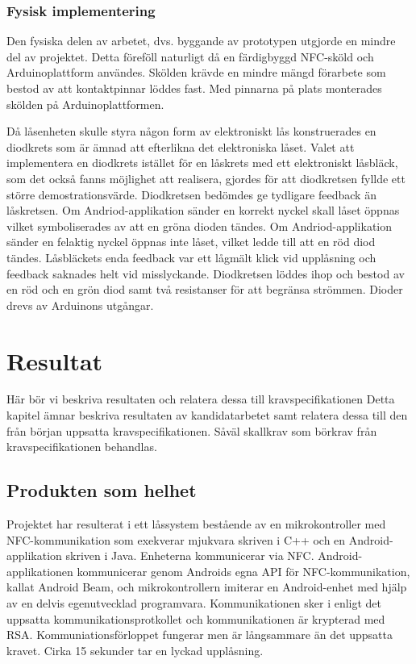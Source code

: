\documentclass[11pt]{article}
\begin{document}
\subsubsection{Fysisk implementering}
Den fysiska delen av arbetet, dvs. byggande av prototypen utgjorde en mindre del av projektet. Detta föreföll naturligt då en färdigbyggd NFC-sköld och Arduinoplattform användes. Skölden krävde en mindre mängd förarbete som bestod av att kontaktpinnar löddes fast. Med pinnarna på plats monterades skölden på Arduinoplattformen.

Då låsenheten skulle styra någon form av elektroniskt lås konstruerades en diodkrets som är ämnad att efterlikna det elektroniska låset. Valet att implementera en diodkrets istället för en låskrets med ett elektroniskt låsbläck, som det också fanns möjlighet att realisera, gjordes för att diodkretsen fyllde ett större demostrationsvärde. Diodkretsen bedömdes ge tydligare feedback än låskretsen. Om Andriod-applikation sänder en korrekt nyckel skall låset öppnas vilket symboliserades av att en gröna dioden tändes. Om Andriod-applikation sänder en felaktig nyckel öppnas inte låset, vilket ledde till att en röd diod tändes. Låsbläckets enda feedback var ett lågmält klick vid upplåsning och feedback saknades helt vid misslyckande. Diodkretsen löddes ihop och bestod av en röd och en grön diod samt två resistanser för att begränsa strömmen. Dioder drevs av Arduinons utgångar.


\section{Resultat}
Här bör vi beskriva resultaten och relatera dessa till kravspecifikationen
Detta kapitel ämnar beskriva resultaten av kandidatarbetet samt relatera dessa till den från början uppsatta kravspecifikationen. Såväl skallkrav som börkrav från kravspecifikationen behandlas.

\subsection{Produkten som helhet}
Projektet har resulterat i ett låssystem bestående av en mikrokontroller med NFC-kommunikation som exekverar mjukvara skriven i C++ och en Android-applikation skriven i Java. Enheterna kommunicerar via NFC. Android-applikationen kommunicerar genom Androids egna API för NFC-kommunikation, kallat Android Beam, och mikrokontrollern imiterar en Android-enhet med hjälp av en delvis egenutvecklad programvara. Kommunikationen sker i enligt det uppsatta kommunikationsprotkollet och kommunikationen är krypterad med RSA. Kommuniationsförloppet fungerar men är långsammare än det uppsatta kravet. Cirka 15 sekunder tar en lyckad upplåsning.
\end{document}
